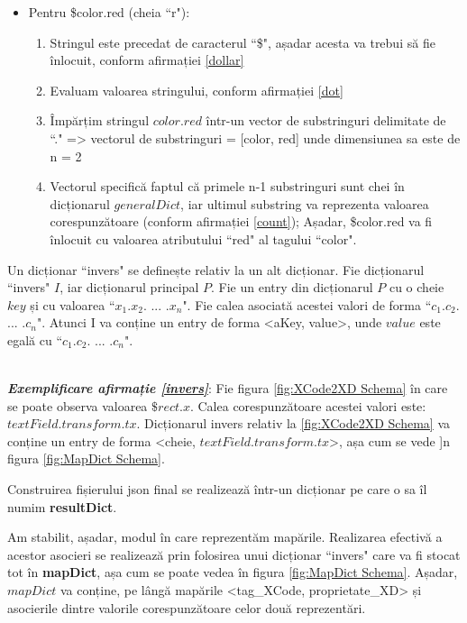 \begin{itemize} \label{modalitate}
\item Pentru \$color.red (cheia ``r"): 
\begin{enumerate}
\item Stringul este precedat de caracterul ``\$", așadar acesta va trebui să fie înlocuit, conform afirmației \ref{dollar}
\item Evaluam valoarea stringului, conform afirmației \ref{dot}
\item Împărțim stringul $color.red$ într-un vector de substringuri delimitate de ``." => vectorul de substringuri = [color, red] unde dimensiunea sa este de n = 2
\item Vectorul specifică faptul că primele n-1 substringuri sunt chei în dicționarul $generalDict$, iar ultimul substring va reprezenta valoarea corespunzătoare (conform afirmației \ref{count}); Așadar, \$color.red va fi înlocuit cu valoarea atributului ``red" al tagului ``color".
\end{enumerate}
\end{itemize}


\begin{mydef} \label{invers}
Un dicționar ``invers" se definește relativ la un alt dicționar. 
Fie dicționarul ``invers" $I$, iar dicționarul principal $P$. 
Fie un entry din dicționarul $P$ cu o cheie $key$ și cu valoarea ``$x_1$.$x_2$. ... .$x_n$".
Fie calea asociată acestei valori de forma ``$c_1$.$c_2$. ... .$c_n$".
Atunci I va conține un entry de forma <aKey, value>, unde $value$ este egală cu ``$c_1$.$c_2$. ... .$c_n$".
\end{mydef}
\\
\textbf{\textit{Exemplificare afirmație \ref{invers}}}: Fie figura \ref{fig:XCode2XD Schema} în care se poate observa valoarea $\$rect.x$. Calea corespunzătoare acestei valori este: $textField.transform.tx$. Dicționarul invers relativ la \ref{fig:XCode2XD Schema} va conține un entry de forma <cheie, $textField.transform.tx$>, așa cum se vede ]n figura \ref{fig:MapDict Schema}. 
\\
\begin{myNote}
Construirea fișierului json final se realizează într-un dicționar pe care o sa îl numim \textbf{resultDict}.
\end{myNote}

Am stabilit, așadar, modul în care reprezentăm mapările. Realizarea efectivă a acestor asocieri se realizează prin folosirea unui dicționar ``invers" care va fi stocat tot în \textbf{mapDict}, așa cum se poate vedea în figura \ref{fig:MapDict Schema}. Așadar, $mapDict$ va conține, pe lângă mapările <tag_XCode, proprietate_XD> și asocierile dintre valorile corespunzătoare celor două reprezentări.

